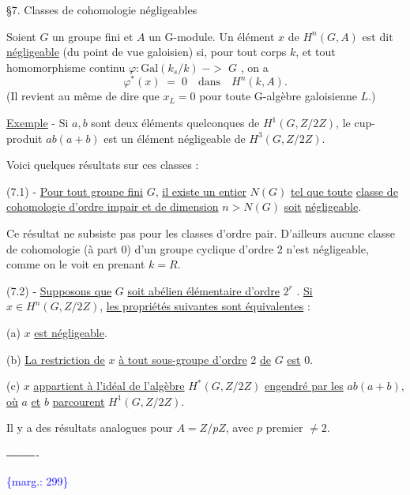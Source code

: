 \documentclass[11pt]{article}
\newcommand{\scanpage}[1]{\par\bigskip\noindent{\small\sffamily[scan #1]}\par}
\newcommand{\mspage}[1]{{\small\sffamily[p.\,#1]}}
\newcommand{\margin}[1]{\textcolor{blue}{\{\textsf{marg.:} #1\}}}
\newcommand{\uline}[1]{\underline{#1}}
\begin{document}
§7. Classes de cohomologie négligeables

Soient $G$ un groupe fini et $A$ un G-module. Un élément $x$ de
$H^{n}(G, A)$ est dit \uline{négligeable} (du point de vue galoisien) si, pour tout
corps $k$, et tout homomorphisme continu $\varphi : \mathrm{Gal}(k_{s}/k) \;{-}{>}\; G$ , on a
\[ \varphi^{*}(x) \;=\; 0 \quad \text{dans} \quad H^{n}(k, A). \]
(Il revient au même de dire que $x_{L} = 0$ pour toute G-algèbre galoisienne $L$.)

\uline{Exemple} - Si $a,b$ sont deux éléments quelconques de $H^{1}(G, Z/2Z)$, le
cup-produit $ab(a+b)$ est un élément négligeable de $H^{3}(G, Z/2Z)$.

Voici quelques résultats sur ces classes :

(7.1) - \uline{Pour tout groupe fini} $G$, \uline{il existe un entier} $N(G)$ \uline{tel que toute}
\uline{classe de cohomologie d'ordre impair et de dimension} $n > N(G)$ \uline{soit}
\uline{négligeable}.

Ce résultat ne subsiste pas pour les classes d'ordre pair. D'ailleurs
aucune classe de cohomologie (à part $0$) d'un groupe cyclique d'ordre $2$
n'est négligeable, comme on le voit en prenant $k = R$.

(7.2) - \uline{Supposons que} $G$ \uline{soit abélien élémentaire d'ordre} $2^{r}$ .
\uline{Si} $x \in H^{n}(G, Z/2Z)$, \uline{les propriétés suivantes sont équivalentes} :

(a) $x$ \uline{est négligeable}.

(b) \uline{La restriction de} $x$ \uline{à tout sous-groupe d'ordre} 2 \uline{de} $G$ \uline{est} $0$.

(c) $x$ \uline{appartient à l'idéal de l'algèbre} $H^{*}(G, Z/2Z)$ \uline{engendré par les}
$ab(a+b)$, \uline{où} $a$ \uline{et} $b$ \uline{parcourent} $H^{1}(G, Z/2Z)$.

Il y a des résultats analogues pour $A = Z/pZ$, avec $p$ premier $\neq 2$.

\begin{center}
\texttt{----------------}
\end{center}

\margin{299}

\clearpage
\scanpage{119/300}
\mspage{- 13 -}
\end{document}
